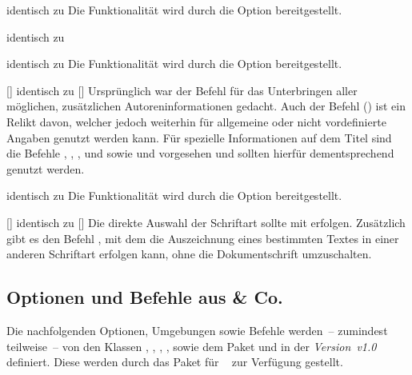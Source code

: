 \begin{Entity*}{}
\begin{Declaration}{}{%
  identisch zu %
}
\printdeclarationlist%
%
Die Funktionalität wird durch die Option  bereitgestellt.
\end{Declaration}

\begin{Declaration}{}{%
  identisch zu %
}
\begin{Declaration}{}{%
  identisch zu %
}
\printdeclarationlist%
%
Die Funktionalität wird durch die Option  bereitgestellt.
\end{Declaration}
\end{Declaration}

\begin{Declaration}{[]}{%
  identisch zu []%
}
\printdeclarationlist%
%
Ursprünglich war der Befehl für das Unterbringen aller möglichen, zusätzlichen 
Autoreninformationen gedacht. Auch der Befehl () ist ein 
Relikt davon, welcher jedoch weiterhin für allgemeine oder nicht vordefinierte 
Angaben genutzt werden kann. Für spezielle Informationen auf dem Titel sind die 
Befehle , , , 
 und  sowie 
 und  vorgesehen und sollten hierfür 
dementsprechend genutzt werden.
\end{Declaration}

\begin{Declaration}{}{%
  identisch zu %
}
\printdeclarationlist%
%
Die Funktionalität wird durch die Option  bereitgestellt.
\end{Declaration}

\begin{Declaration}{[]}{%
  identisch zu []%
}
\printdeclarationlist%
%
Die direkte Auswahl der Schriftart sollte mit  erfolgen. 
Zusätzlich gibt es den Befehl , mit dem die Auszeichnung 
eines bestimmten Textes in einer anderen Schriftart erfolgen kann, ohne die 
Dokumentschrift umzuschalten.
\end{Declaration}
%


\subsection{Optionen und Befehle aus  \& Co.}
%
Die nachfolgenden Optionen, Umgebungen sowie Befehle werden~-- zumindest 
teilweise~-- von den Klassen , , 
, ,  sowie dem Paket 
 und \TUDScript in der \emph{Version~v1.0} definiert. Diese 
werden durch das Paket  für \TUDScript~\vTUDScript{} zur 
Verfügung gestellt.


\end{Entity*}
